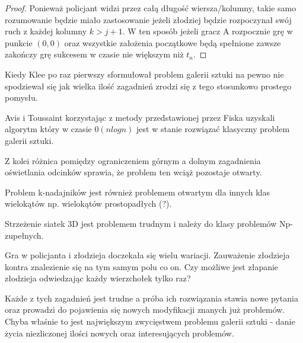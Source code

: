 \documentclass[brudnopis]{xmgr}
\theoremstyle{definition}
\begin{document}
\begin{proof}
	\indent Ponieważ policjant widzi przez całą długość wiersza/kolumny, takie samo rozumowanie będzie miało zastosowanie jeżeli złodziej będzie rozpoczynał swój ruch z każdej kolumny $k > j + 1$. W ten sposób jeżeli gracz A rozpocznie grę w punkcie $(0,0)$ oraz wszystkie założenia początkowe będą spełnione zawsze zakończy grę sukcesem w czasie nie większym niż $t_n$. 
\end{proof} 
\summary
Kiedy Klee po raz pierwszy sformułował problem galerii sztuki na pewno nie spodziewał się jak wielka ilość zagadnień zrodzi się z tego stosunkowo prostego pomysłu.

Avis i Toussaint \cite{avis} korzystając z metody przedstawionej przez Fiska \cite{fisk} uzyskali algorytm który w czasie $0(n logn)$ jest w stanie rozwiązać klasyczny problem galerii sztuki.

Z kolei różnica pomiędzy ograniczeniem górnym a dolnym zagadnienia oświetlania odcinków sprawia, że problem ten wciąż pozostaje otwarty.

Problem k-nadajników jest również problemem otwartym dla innych klas wielokątów np. wielokątów prostopadłych (?).

Strzeżenie siatek 3D jest problemem trudnym i należy do klasy problemów Np-zupełnych.

Gra w policjanta i złodzieja doczekała się wielu wariacji. Zauważenie złodzieja kontra znalezienie się na tym samym polu co on. Czy możliwe jest złapanie złodzieja odwiedzając każdy wierzchołek tylko raz? 

Każde z tych zagadnień jest trudne a próba ich rozwiązania stawia nowe pytania oraz prowadzi do pojawienia się nowych modyfikacji znanych już problemów. Chyba właśnie to jest największym zwycięstwem problemu galerii sztuki - danie życia niezliczonej ilości nowych oraz interesujących problemów.

\appendix
\end{document}
